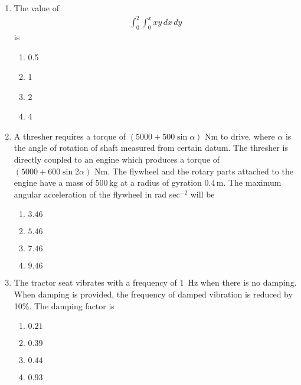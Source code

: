\documentclass[journal]{IEEEtran}
\numberwithin{equation}{enumi}
\numberwithin{figure}{enumi}
\begin{document}
\begin{enumerate}
    \item The value of \begin{align*}\int_0^2 \int_0^x xy \, dx \, dy\end{align*} is
     \hfill{}
\begin{multicols}{4}
    \begin{enumerate}
    \item 0.5
    \item 1
    \item 2
    \item 4
    \end{enumerate}
    \end{multicols}  



 
    \item A thresher requires a torque of $(5000 + 500 \sin{\alpha})$ Nm to drive, where $\alpha$ is the angle of rotation of shaft measured from certain datum. The thresher is directly coupled to an engine which produces a torque of $(5000 + 600 \sin{2\alpha})$ Nm. The flywheel and the rotary parts attached to the engine have a mass of $500\,\text{kg}$ at a radius of gyration $0.4\, \text{m}$. The maximum angular acceleration of the flywheel in rad sec$^{-2}$ will be
       \hfill{}
\begin{multicols}{4}
    \begin{enumerate}
    \item $3.46$
    \item $5.46$
    \item $7.46$
    \item $9.46$  
    \end{enumerate}
    \end{multicols}  
  


   \item The tractor seat vibrates with a frequency of 1~Hz when there is no damping. When damping is provided, the frequency of damped vibration is reduced by 10\%. The damping factor is
    \hfill{}
\begin{multicols}{4}
    \begin{enumerate}
    \item $0.21$
    \item $ 0.39$
    \item $0.44$
    \item $0.93$  
    \end{enumerate}
    \end{multicols}  
   



\end{enumerate}
\end{document}
